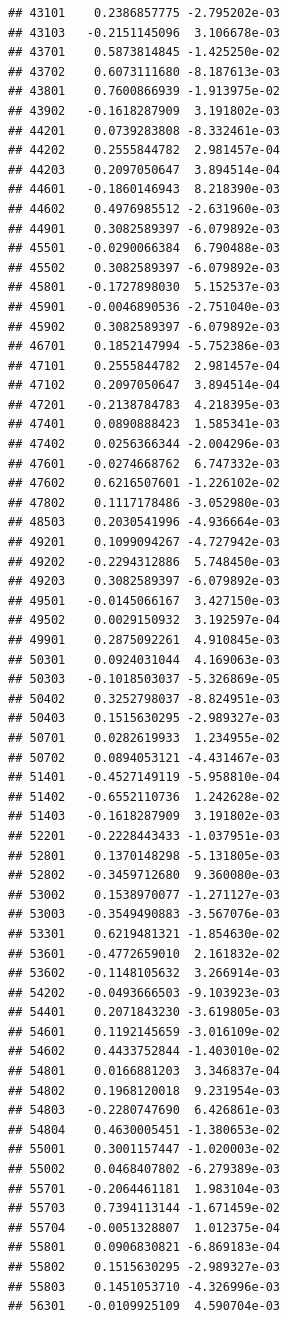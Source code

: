 \documentclass[ignorenonframetext,]{beamer}
\begin{document}
\begin{frame}[fragile]
\begin{verbatim}
## 43101    0.2386857775 -2.795202e-03
## 43103   -0.2151145096  3.106678e-03
## 43701    0.5873814845 -1.425250e-02
## 43702    0.6073111680 -8.187613e-03
## 43801    0.7600866939 -1.913975e-02
## 43902   -0.1618287909  3.191802e-03
## 44201    0.0739283808 -8.332461e-03
## 44202    0.2555844782  2.981457e-04
## 44203    0.2097050647  3.894514e-04
## 44601   -0.1860146943  8.218390e-03
## 44602    0.4976985512 -2.631960e-03
## 44901    0.3082589397 -6.079892e-03
## 45501   -0.0290066384  6.790488e-03
## 45502    0.3082589397 -6.079892e-03
## 45801   -0.1727898030  5.152537e-03
## 45901   -0.0046890536 -2.751040e-03
## 45902    0.3082589397 -6.079892e-03
## 46701    0.1852147994 -5.752386e-03
## 47101    0.2555844782  2.981457e-04
## 47102    0.2097050647  3.894514e-04
## 47201   -0.2138784783  4.218395e-03
## 47401    0.0890888423  1.585341e-03
## 47402    0.0256366344 -2.004296e-03
## 47601   -0.0274668762  6.747332e-03
## 47602    0.6216507601 -1.226102e-02
## 47802    0.1117178486 -3.052980e-03
## 48503    0.2030541996 -4.936664e-03
## 49201    0.1099094267 -4.727942e-03
## 49202   -0.2294312886  5.748450e-03
## 49203    0.3082589397 -6.079892e-03
## 49501   -0.0145066167  3.427150e-03
## 49502    0.0029150932  3.192597e-04
## 49901    0.2875092261  4.910845e-03
## 50301    0.0924031044  4.169063e-03
## 50303   -0.1018503037 -5.326869e-05
## 50402    0.3252798037 -8.824951e-03
## 50403    0.1515630295 -2.989327e-03
## 50701    0.0282619933  1.234955e-02
## 50702    0.0894053121 -4.431467e-03
## 51401   -0.4527149119 -5.958810e-04
## 51402   -0.6552110736  1.242628e-02
## 51403   -0.1618287909  3.191802e-03
## 52201   -0.2228443433 -1.037951e-03
## 52801    0.1370148298 -5.131805e-03
## 52802   -0.3459712680  9.360080e-03
## 53002    0.1538970077 -1.271127e-03
## 53003   -0.3549490883 -3.567076e-03
## 53301    0.6219481321 -1.854630e-02
## 53601   -0.4772659010  2.161832e-02
## 53602   -0.1148105632  3.266914e-03
## 54202   -0.0493666503 -9.103923e-03
## 54401    0.2071843230 -3.619805e-03
## 54601    0.1192145659 -3.016109e-02
## 54602    0.4433752844 -1.403010e-02
## 54801    0.0166881203  3.346837e-04
## 54802    0.1968120018  9.231954e-03
## 54803   -0.2280747690  6.426861e-03
## 54804    0.4630005451 -1.380653e-02
## 55001    0.3001157447 -1.020003e-02
## 55002    0.0468407802 -6.279389e-03
## 55701   -0.2064461181  1.983104e-03
## 55703    0.7394113144 -1.671459e-02
## 55704   -0.0051328807  1.012375e-04
## 55801    0.0906830821 -6.869183e-04
## 55802    0.1515630295 -2.989327e-03
## 55803    0.1451053710 -4.326996e-03
## 56301   -0.0109925109  4.590704e-03

\end{verbatim}
\end{frame}
\end{document}
